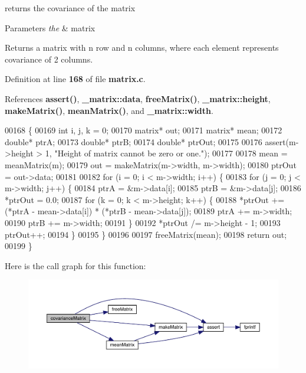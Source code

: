 returns the covariance of the matrix 


\begin{DoxyParams}{Parameters}
{\em the} & matrix \\
\hline
\end{DoxyParams}
\begin{DoxyReturn}{Returns}
a matrix with n row and n columns, where each element represents covariance of 2 columns. 
\end{DoxyReturn}


Definition at line \textbf{ 168} of file \textbf{ matrix.\+c}.



References \textbf{ assert()}, \textbf{ \+\_\+matrix\+::data}, \textbf{ free\+Matrix()}, \textbf{ \+\_\+matrix\+::height}, \textbf{ make\+Matrix()}, \textbf{ mean\+Matrix()}, and \textbf{ \+\_\+matrix\+::width}.


\begin{DoxyCode}
00168                                     \{
00169     \textcolor{keywordtype}{int} i, j, k = 0;
00170     matrix* out;
00171     matrix* mean;
00172     \textcolor{keywordtype}{double}* ptrA;
00173     \textcolor{keywordtype}{double}* ptrB;
00174     \textcolor{keywordtype}{double}* ptrOut;
00175 
00176     assert(m->height > 1, \textcolor{stringliteral}{"Height of matrix cannot be zero or one."});
00177 
00178     mean = meanMatrix(m);
00179     out = makeMatrix(m->width, m->width);
00180     ptrOut = out->data;
00181 
00182     \textcolor{keywordflow}{for} (i = 0; i < m->width; i++) \{
00183         \textcolor{keywordflow}{for} (j = 0; j < m->width; j++) \{
00184              ptrA = &m->data[i];
00185              ptrB = &m->data[j];
00186              *ptrOut = 0.0;
00187              \textcolor{keywordflow}{for} (k = 0; k < m->height; k++) \{
00188                  *ptrOut += (*ptrA - mean->data[i]) * (*ptrB - mean->data[j]);
00189                  ptrA += m->width;
00190                  ptrB += m->width;
00191              \}
00192              *ptrOut /= m->height - 1;
00193              ptrOut++;
00194         \}
00195     \}
00196 
00197     freeMatrix(mean);
00198     \textcolor{keywordflow}{return} out;
00199 \}
\end{DoxyCode}
Here is the call graph for this function\+:\nopagebreak
\begin{figure}[H]
\begin{center}
\leavevmode
\includegraphics[width=350pt]{matrix_8c_ae6dab569959c360cf165136a3b625edd_cgraph}
\end{center}
\end{figure}
\mbox{\label{matrix_8c_af49b525d7476c365833db9acd975e3a5}} 
